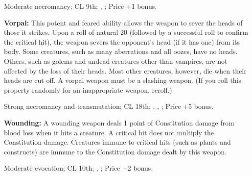 Moderate necromancy; CL 9th; , ; Price +1 bonus.


\textbf{Vorpal:} This potent and feared ability allows the weapon to sever the heads of those it strikes. Upon a roll of natural 20 (followed by a successful roll to confirm the critical hit), the weapon severs the opponent's head (if it has one) from its body. Some creatures, such as many aberrations and all oozes, have no heads. Others, such as golems and undead creatures other than vampires, are not affected by the loss of their heads. Most other creatures, however, die when their heads are cut off. A vorpal weapon must be a slashing weapon. (If you roll this property randomly for an inappropriate weapon, reroll.)

Strong necromancy and transmutation; CL 18th; , , ; Price +5 bonus.


\textbf{Wounding:} A wounding weapon deals 1 point of Constitution damage from blood loss when it hits a creature. A critical hit does not multiply the Constitution damage. Creatures immune to critical hits (such as plants and constructs) are immune to the Constitution damage dealt by this weapon.

Moderate evocation; CL 10th; , ; Price +2 bonus.
